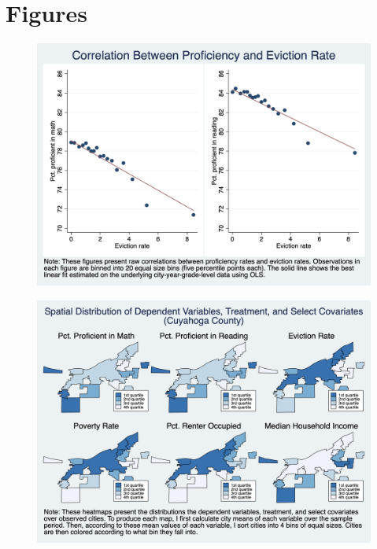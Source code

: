 \documentclass[12pt]{article}
\begin{document}
\clearpage

\section*{Figures} \label{sec:fig}

\begin{figure}[H]
    \centering
    \includegraphics[scale=0.4]{output/graphs/outcome_binscatter.png}
    \caption{}
    \label{fig:my_label}
\end{figure}

\begin{landscape}
\begin{figure}
    \centering
    \includegraphics[scale=0.5]{output/graphs/maps.png}
    \caption{}
    \label{fig:my_label}
\end{figure}
\end{landscape}
\end{document}
